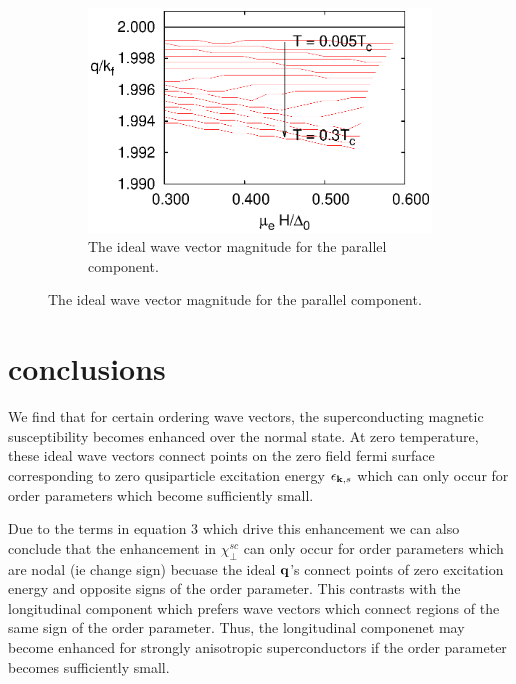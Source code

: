 \documentclass[usletter,aps,prb,10pt,amssymb,amsmath,twocolumn]{revtex4-1}
\begin{document}
\begin{figure}
	\begin{subfigure}[b]{0.23\textwidth}

                \includegraphics[width=\textwidth]{./figures/max_q_z.eps}
                \caption{The ideal wave vector magnitude for the parallel component.}
        \end{subfigure}
 \end{figure}
 
\section{conclusions}
We find that for certain ordering wave vectors, the superconducting magnetic susceptibility becomes enhanced over the normal state. At zero temperature, these ideal wave vectors connect points on the zero field fermi surface corresponding to zero qusiparticle excitation energy $\epsilon_{{\bf k},s}$ which can only occur for order parameters which become sufficiently small.

Due to the terms in equation 3 which drive this enhancement we can also conclude that the enhancement in $\chi^{sc}_{\perp}$ can only occur for order parameters which are nodal (ie change sign) becuase the ideal $\bf q$'s connect points of zero excitation energy and opposite signs of the order parameter. This contrasts with the longitudinal component which prefers wave vectors which connect regions of the same sign of the order parameter. Thus, the longitudinal componenet may become enhanced for strongly anisotropic superconductors if the order parameter becomes sufficiently small.
\end{document}
